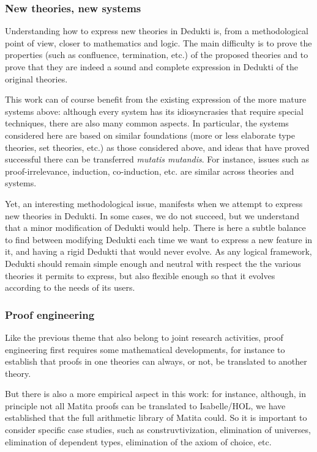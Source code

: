 \subsubsection*{New theories, new systems}

Understanding how to express new theories in Dedukti is, from a
methodological point of view, closer to mathematics and logic.  The
main difficulty is to prove the properties (such as confluence,
termination, etc.) of the proposed theories and to prove that they are
indeed a sound and complete expression in Dedukti of the original
theories.

This work can of course benefit from the existing expression of the
more mature systems above: although every system has its
idiosyncrasies that require special techniques, there are also many
common aspects. In particular, the systems considered here are based
on similar foundations (more or less elaborate type theories, set
theories, etc.) as those considered above, and ideas that have proved
successful there can be transferred {\em mutatis mutandis}. For
instance, issues such as proof-irrelevance, induction, co-induction,
etc. are similar across theories and systems.

Yet, an interesting methodological issue, manifests when we attempt to
express new theories in Dedukti. In some cases, we do not succeed, but
we understand that a minor modification of Dedukti would help. There
is here a subtle balance to find between modifying Dedukti each time
we want to express a new feature in it, and having a rigid Dedukti
that would never evolve. As any logical framework, Dedukti should
remain simple enough and neutral with respect the the various theories
it permits to express, but also flexible enough so that it evolves
according to the needs of its users.

\subsubsection*{Proof engineering}

Like the previous theme that also belong to joint research activities,
proof engineering first requires some mathematical developments, for
instance to establish that proofs in one theories can always, or not,
be translated to another theory.

But there is also a more empirical aspect in this work: for instance,
although, in principle not all Matita proofs can be translated to
Isabelle/HOL, we have established that the full arithmetic library of
Matita could. So it is important to consider specific case studies,
such as construvtivization, elimination of universes, elimination of
dependent types, elimination of the axiom of choice, etc.

